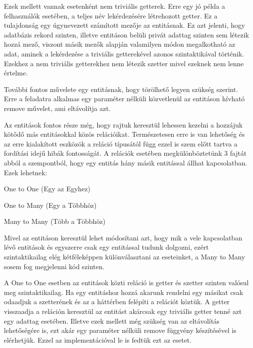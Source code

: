 Ezek mellett vannak esetenként nem triviális getterek. Erre egy jó példa a felhasználók esetében, a teljes név lekérdezésére létrehozott getter. Ez a tulajdonság egy úgynevezett számított mezője az entitásnak. Ez azt jelenti, hogy adatbázis rekord szinten, illetve entitáson belüli privát adattag szinten sem létezik hozzá mező, viszont másik mezők alapján valamilyen módon megalkotható az adat, aminek a lekérdezése a triviális getterekével azonos szintaktikával történik. Ezekhez a nem triviális getterekhez nem létezik szetter mivel ezeknek nem lenne értelme.

További fontos művelete egy entitásnak, hogy törölhető legyen szükség szerint. Erre a feladatra alkalmas egy paraméter nélküli közvetlenül az entitáson hívható remove művelet, ami eltávolítja azt.

Az entitások fontos része még, hogy rajtuk keresztül lehessen kezelni a hozzájuk kötődő más entitásokkal közös relációikat. Természetesen erre is van lehetőség és az erre kialakított eszközök a reláció típusától függ ezzel is szem előtt tartva a fordítási idejű hibák fontosságát. A relációk esetében megkülönböztetünk 3 fajtát abból a szempontból, hogy egy entitás hány másik entitással állhat kapcsolatban. Ezek lehetnek:

\begin{compactitem}
	\item One to One (Egy az Egyhez)
	\item One to Many (Egy a Többhöz)
	\item Many to Many (Több a Többhöz)
\end{compactitem}

Mivel az entitáson keresztül lehet módosítani azt, hogy mik a vele kapcsolatban lévő entitások és egyszerre csak egy entitással tudunk dolgozni, ezért szintaktikailag elég kétféleképpen különválasztani az eseteinket, a Many to Many sosem fog megjelenni kód szinten.

A One to One esetben az entitások közti reláció is getter és szetter szinten valósul meg szintaktikailag. Ha egy entitáshoz hozzá akarunk rendelni egy másikat csak odaadjuk a szetterének és az a háttérben felépíti a relációt köztük. A getter visszaadja a reláción keresztül az entitást akárcsak egy triviális getter tenné azt egy adattag esetében. Illetve ezek mellett még szükség van az eltávolítás lehetőségére is, ezt akár egy paraméter nélküli remove függvény készítésével is elérhetjük. Ezzel az implementációval le is fedtük ezt az esetet.

